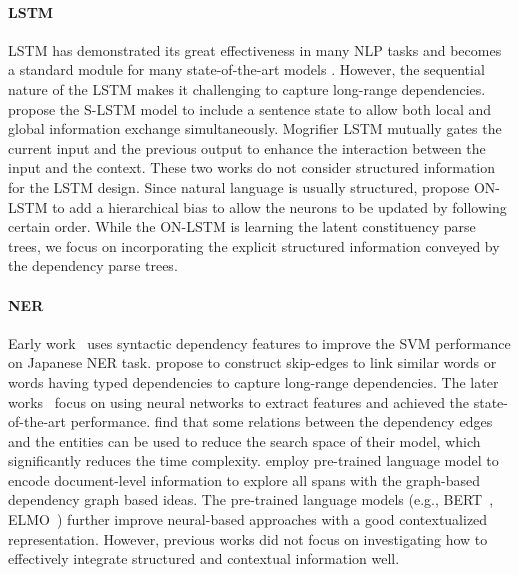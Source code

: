 \documentclass[11pt]{article}
\begin{document}
\paragraph{LSTM}
LSTM has demonstrated its great effectiveness in many NLP tasks and becomes a standard module for many state-of-the-art models \cite{Wen2015SemanticallyCL, Ma2016EndtoendSL, dozat2017deep}. However, the sequential nature of the LSTM makes it challenging to capture long-range dependencies. \citet{Zhang2018SentenceStateLF} propose the S-LSTM model to include a sentence state to allow both local and global information exchange simultaneously. Mogrifier LSTM \cite{Moglstm2020} mutually gates the current input and the previous output to enhance the interaction between the input and the context. 
These two works do not consider structured information for the LSTM design.
Since natural language is usually structured, \citet{onlstm2018OrderedNI} propose ON-LSTM to add a hierarchical bias to allow the neurons to be updated by following {\color{black}certain} order. 
While the ON-LSTM is learning the latent constituency parse trees, we focus on incorporating the {\color{black}explicit} structured information conveyed by the dependency parse trees. 
\paragraph{NER}
Early work~\cite{sasano2008japanese} uses syntactic dependency features to improve the SVM performance on Japanese NER task. \citet{liu2010recognizing} propose to construct skip-edges to link similar words or words having typed dependencies to capture long-range dependencies. The later works~\cite{collobert2011natural,lample2016neural, chiu-nichols-2016-named} focus on using neural networks to extract features and achieved the state-of-the-art performance. \citet{jie2017efficient} find that some relations between the dependency edges and the entities {\color{black}can be used to} reduce the search space of their model, which significantly reduces the time complexity. \citet{yu-etal-2020-named} employ pre-trained language model to encode document-level information to explore  all spans with  the graph-based dependency graph based ideas. The  pre-trained language models (e.g., BERT~\cite{devlin2019bert}, ELMO~\cite{peters2018deep}) further improve neural-based approaches with a good contextualized representation. 
{\color{black}However, previous works did not focus on investigating how to effectively integrate structured and contextual information well.}
\end{document}
